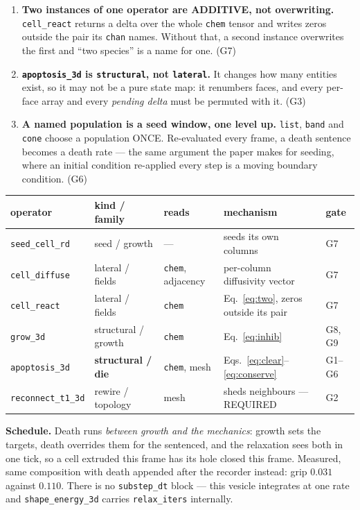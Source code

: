 \documentclass[10pt,a4paper]{article}
\newcommand{\code}[1]{\texttt{#1}}
\newcommand{\op}[1]{\texttt{#1}}
\begin{document}
\begin{enumerate}\itemsep0pt
\item \textbf{Two instances of one operator are ADDITIVE, not overwriting.} \op{cell\_react}
  returns a delta over the whole \code{chem} tensor and writes zeros outside the pair its
  \code{chan} names. Without that, a second instance overwrites the first and ``two species'' is a
  name for one. (G7)
\item \textbf{\op{apoptosis\_3d} is \code{structural}, not \code{lateral}.} It changes how many
  entities exist, so it may not be a pure state map: it renumbers faces, and every per-face array
  and every \emph{pending delta} must be permuted with it. (G3)
\item \textbf{A named population is a seed window, one level up.} \op{list}, \op{band} and \op{cone}
  choose a population ONCE. Re-evaluated every frame, a death sentence becomes a death rate --- the
  same argument the paper makes for seeding, where an initial condition re-applied every step is a
  moving boundary condition. (G6)
\end{enumerate}

\begin{center}\footnotesize
\begin{tabular}{@{}lllp{4.4cm}p{2.6cm}@{}}\toprule
\textbf{operator} & \textbf{kind / family} & \textbf{reads} & \textbf{mechanism} & \textbf{gate}\\\midrule
\op{seed\_cell\_rd} & seed / growth & --- & seeds its own columns & G7\\
\op{cell\_diffuse}  & lateral / fields & \code{chem}, adjacency & per-column diffusivity vector & G7\\
\op{cell\_react}    & lateral / fields & \code{chem} & Eq.~\eqref{eq:two}, zeros outside its pair & G7\\
\op{grow\_3d}       & structural / growth & \code{chem} & Eq.~\eqref{eq:inhib} & G8, G9\\
\op{apoptosis\_3d}  & \textbf{structural / die} & \code{chem}, mesh &
  Eqs.~\eqref{eq:clear}--\eqref{eq:conserve} & G1--G6\\
\op{reconnect\_t1\_3d} & rewire / topology & mesh & sheds neighbours --- REQUIRED & G2\\
\bottomrule
\end{tabular}
\end{center}

\textbf{Schedule.} Death runs \emph{between growth and the mechanics}: growth sets the targets, death
overrides them for the sentenced, and the relaxation sees both in one tick, so a cell extruded this
frame has its hole closed this frame. Measured, same composition with death appended after the
recorder instead: grip $0.031$ against $0.110$. There is no \code{substep\_dt} block --- this vesicle
integrates at one rate and \op{shape\_energy\_3d} carries \code{relax\_iters} internally.
\end{document}
